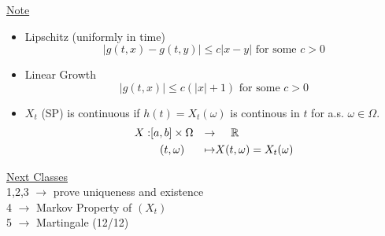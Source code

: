 \documentclass[12pt]{report}
\newcommand{\R}{\mathbb{R}}
\renewcommand{\1}{\mathbb{1}}
\renewcommand{\O}{\Omega}
\theoremstyle{break}
\theoremstyle{newdef}
\theoremstyle{remark}
\begin{document}
\underline{Note}
\begin{itemize}
\item
Lipschitz (uniformly in time)
$$
|g(t,x) - g(t,y)| \leq c|x-y| \text{ for some } c > 0
$$

\item
Linear Growth
$$
|g(t,x)| \leq c(|x|+1) \text{ for some } c > 0
$$

\item
$X_t$ (SP) is continuous if $h(t) = X_t(\omega)$ is continous in $t$ for a.s. $\omega \in \O$.
$$
\begin{aligned}
X : &[a,b] \times \Omega &\rightarrow &\hspace{5mm}\R\\
&\hspace{3mm}(t,\omega) &\mapsto &X(t,\omega) = X_t(\omega)
\end{aligned}
$$

\end{itemize}


\underline{Next Classes}\\
1,2,3 $\longrightarrow$ prove uniqueness and existence\\
4 $\longrightarrow$ Markov Property of $(X_t)$\\
5 $\longrightarrow$ Martingale (12/12)
\end{document}
